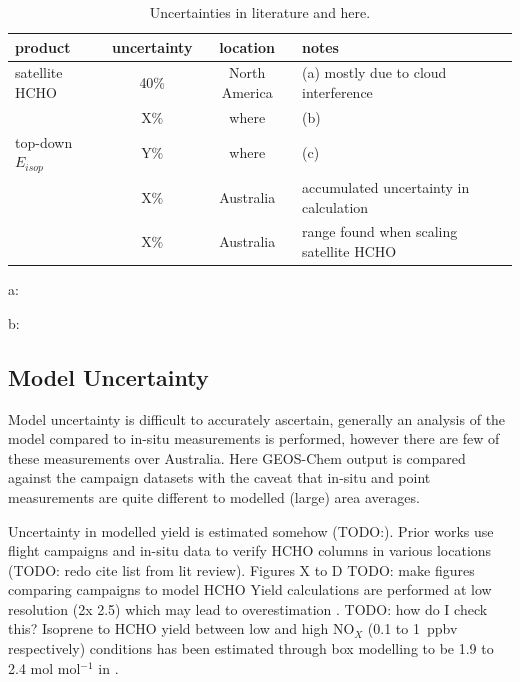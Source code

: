  \begin{table}\begin{threeparttable}
    \caption{Uncertainties in literature and here.}
    \begin{tabular}{ l | c  c  l } 
      \toprule
      product & uncertainty & location & notes \\
      \midrule
      satellite HCHO & 40\% & North America & (a) mostly due to cloud interference \\
       & X\% & where & (b) \\
      top-down $E_{isop}$ & Y\% & where & (c) \\
       & X\% & Australia & accumulated uncertainty in calculation \\
       & X\% & Australia & range found when scaling satellite HCHO \\
      \bottomrule
    \end{tabular}
    \begin{tablenotes} 
      \item a: \textcite{Millet2006,Palmer2006}
      \item b: 
    \end{tablenotes}
    \label{Model:Uncertainty:tab_uncertainties}
  \end{threeparttable}\end{table}
  
  \subsection{Model Uncertainty}
    \label{Model:Uncertainty:Model}
    
    
    Model uncertainty is difficult to accurately ascertain, generally an analysis of the model compared to in-situ measurements is performed, however there are few of these measurements over Australia.
    Here GEOS-Chem output is compared against the campaign datasets with the caveat that in-situ and point measurements are quite different to modelled (large) area averages.
    
    
    Uncertainty in modelled yield is estimated somehow (TODO:).
    Prior works use flight campaigns and in-situ data to verify HCHO columns in various locations (TODO: redo cite list from lit review).
    Figures X to D TODO: make figures comparing campaigns to model HCHO
    Yield calculations are performed at low resolution (2\degr x 2.5\degr) which may lead to overestimation \parencite{Yu2016}.
    TODO: how do I check this?
    Isoprene to HCHO yield between low and high NO$_X$ (0.1 to 1~ppbv respectively) conditions has been estimated through box modelling to be 1.9 to 2.4 mol mol$^{-1}$ in \textcite{Bauwens2016}.
    
